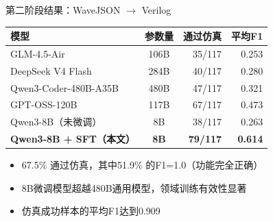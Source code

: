 \documentclass[aspectratio=169,10pt]{beamer}
\begin{document}
\begin{frame}{第二阶段结果：WaveJSON $\to$ Verilog}
\centering
\small
\begin{tabular}{lcrr}
  \toprule
  模型 & 参数量 & 通过仿真 & 平均F1 \\
  \midrule
  GLM-4.5-Air & 106B & 35/117 & 0.253 \\
  DeepSeek V4 Flash & 284B & 40/117 & 0.280 \\
  Qwen3-Coder-480B-A35B & 480B & 47/117 & 0.321 \\
  GPT-OSS-120B & 117B & 67/117 & 0.473 \\
  \midrule
  Qwen3-8B（未微调） & 8B & 38/117 & 0.263 \\
  \textbf{Qwen3-8B + SFT（本文）} & \textbf{8B} & \textbf{79/117} & \textbf{0.614} \\
  \bottomrule
\end{tabular}

\vspace{0.8em}
\begin{itemize}
  \item 67.5\% 通过仿真，其中51.9\% 的F1=1.0（功能完全正确）
  \item 8B微调模型超越480B通用模型，领域训练有效性显著
  \item 仿真成功样本的平均F1达到0.909
\end{itemize}
\end{frame}
\end{document}
